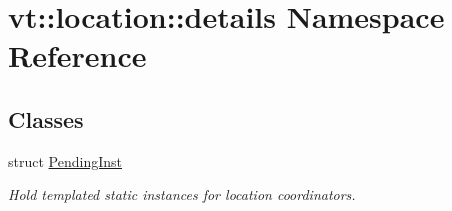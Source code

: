 \hypertarget{namespacevt_1_1location_1_1details}{}\section{vt\+:\+:location\+:\+:details Namespace Reference}
\label{namespacevt_1_1location_1_1details}
\subsection*{Classes}
\begin{DoxyCompactItemize}
\item 
struct \hyperlink{structvt_1_1location_1_1details_1_1_pending_inst}{Pending\+Inst}
\begin{DoxyCompactList}\small\item\em Hold templated static instances for location coordinators. \end{DoxyCompactList}\end{DoxyCompactItemize}
